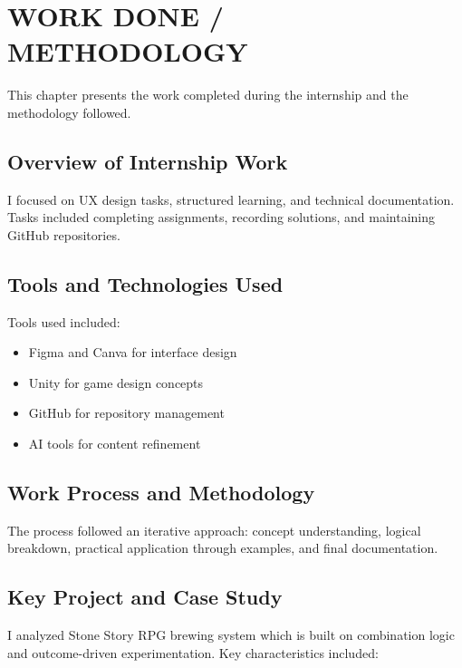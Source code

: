 \documentclass[12pt,a4paper]{report}
\begin{document}
\chapter{WORK DONE / METHODOLOGY}


This chapter presents the work completed during the internship and the methodology followed.


\section{Overview of Internship Work}

I focused on UX design tasks, structured learning, and technical documentation. Tasks included completing assignments, recording solutions, and maintaining GitHub repositories.


\section{Tools and Technologies Used}

Tools used included:

\begin{itemize}[leftmargin=1.5em]
    \item Figma and Canva for interface design
    \item Unity for game design concepts
    \item GitHub for repository management
    \item AI tools for content refinement
\end{itemize}



\section{Work Process and Methodology}

The process followed an iterative approach: concept understanding, logical breakdown, practical application through examples, and final documentation.


\section{Key Project and Case Study}

I analyzed Stone Story RPG brewing system which is built on combination logic and outcome-driven experimentation. Key characteristics included:
\end{document}
